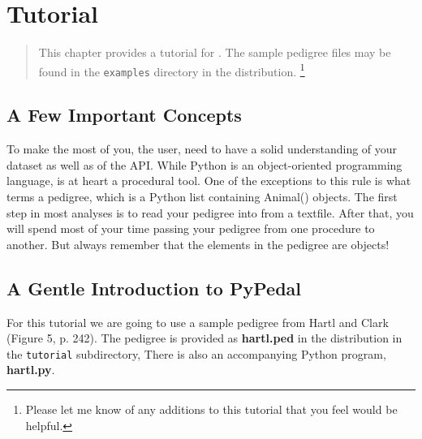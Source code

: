\chapter{Tutorial}
\label{cha:tutorial}

\begin{quote}
This chapter provides a tutorial for \PyPedal{}.  The sample pedigree files may be found in the \texttt{examples} directory in the distribution. \footnote{Please let me know of any additions to this tutorial that you feel would be helpful.}
\end{quote}

\section{A Few Important Concepts}
To make the most of \PyPedal{} you, the user, need to have a solid understanding of your dataset as well as of the \PyPedal{} API.  While Python is an object-oriented programming language, \PyPedal{} is at heart a procedural tool.  One of the exceptions to this rule is what \PyPedal{} terms a pedigree, which is a Python list containing Animal() objects.  The first step in most \PyPedal{} analyses is to read your pedigree into \PyPedal{} from a textfile.  After that, you will spend most of your time passing your pedigree from one procedure to another.  But always remember that the elements in the pedigree are objects!


\section{A Gentle Introduction to PyPedal}
For this tutorial we are going to use a sample pedigree from Hartl and Clark \cite{HartlClark1989a} (Figure 5, p. 242).  The pedigree is provided as \textbf{hartl.ped} in the distribution in the \texttt{tutorial} subdirectory,  There is also an accompanying Python program, \textbf{hartl.py}.

